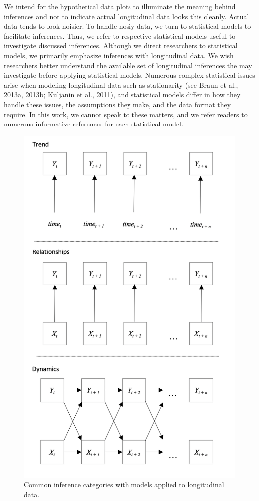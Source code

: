 \documentclass[english,,man]{apa6}
\begin{document}
We intend for the hypothetical data plots to illuminate the meaning behind inferences and not to indicate actual longitudinal data looks this cleanly. Actual data tends to look noisier. To handle nosiy data, we turn to statistical models to facilitate inferences. Thus, we refer to respective statistical models useful to investigate discussed inferences. Although we direct researchers to statistical models, we primarily emphasize inferences with longitudinal data. We wish researchers better understand the available set of longitudinal inferences the may investigate before applying statistical models. Numerous complex statistical issues arise when modeling longitudinal data such as stationarity (see Braun et al., 2013a, 2013b; Kuljanin et al., 2011), and statistical models differ in how they handle these issues, the assumptions they make, and the data format they require. In this work, we cannot speak to these matters, and we refer readers to numerous informative references for each statistical model.

\begin{figure}

{\centering \includegraphics[width=4.66in]{figures/dynamics/framework} 

}

\caption{Common inference categories with models applied to longitudinal data.\label{framework_figure}}\label{fig:unnamed-chunk-6}
\end{figure}
\end{document}
